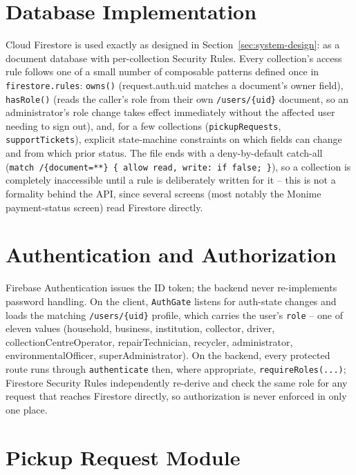 \section{Database Implementation}

Cloud Firestore is used exactly as designed in
Section~\ref{sec:system-design}: as a document database with per-collection
Security Rules. Every collection's access rule follows one of a small number
of composable patterns defined once in \texttt{firestore.rules}: \texttt{owns()}
(request.auth.uid matches a document's owner field), \texttt{hasRole()}
(reads the caller's role from their own \texttt{/users/\{uid\}} document, so an
administrator's role change takes effect immediately without the affected
user needing to sign out), and, for a few collections
(\texttt{pickupRequests}, \texttt{supportTickets}), explicit
state-machine constraints on which fields can change and from which prior
status. The file ends with a deny-by-default catch-all
(\texttt{match~/\{document=**\}~\{~allow~read,~write:~if~false;~\}}), so a
collection is completely inaccessible until a rule is deliberately written for it
-- this is not a formality behind the API, since several screens (most notably
the Monime payment-status screen) read Firestore directly.

\section{Authentication and Authorization}

Firebase Authentication issues the ID token; the backend never re-implements
password handling. On the client, \texttt{AuthGate} listens for auth-state
changes and loads the matching \texttt{/users/\{uid\}} profile, which carries
the user's \texttt{role} -- one of eleven values (household, business,
institution, collector, driver, collectionCentreOperator, repairTechnician,
recycler, administrator, environmentalOfficer, superAdministrator). On the
backend, every protected route runs through \texttt{authenticate} then, where
appropriate, \texttt{requireRoles(...)}; Firestore Security Rules independently
re-derive and check the same role for any request that reaches Firestore
directly, so authorization is never enforced in only one place.

\section{Pickup Request Module}
\label{sec:pickup-module}

